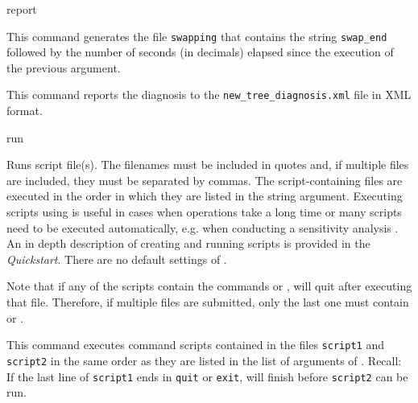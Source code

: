 \begin{command}{report}{}
\begin{poyexamples}
{This command generates the file \texttt{swapping} that contains
the string \texttt{swap\_end} followed by the number of seconds (in
decimals) elapsed since the execution of the previous 
argument.}

{This command reports the diagnosis to the \texttt{new\_tree\_diagnosis.xml}
file in XML format.}

\end{poyexamples}

\begin{poyalso}
\end{poyalso}

\end{command}


\begin{command}{run}{}

\syntax{\obligatory{(\poystring)}}

\begin{poydescription}
Runs \poy script file(s). The filenames must be included in
quotes and, if multiple files are included, they must be separated by commas.
The script-containing files are executed in the order in which they are listed
in the string argument.
Executing scripts using  is useful in cases when
operations take a long time or many scripts need to be executed automatically,
e.g. when conducting a sensitivity analysis \cite{wheeler1995}.
An in depth description of creating and running scripts is provided in 
the \emph{Quickstart}. There are no default settings of .
\end{poydescription}

\begin{statement}
Note that if any of the scripts contain the commands  or
, \poy will quit after executing that file. Therefore, if
multiple files are submitted, only the last one must contain 
or .
\end{statement}

\begin{poyexamples}
{This command executes \poy command scripts contained in the files \texttt{script1}
and \texttt{script2} in the same order as they are listed in the list of arguments of
. Recall: If the last line of \texttt{script1} ends in \texttt{quit} or 
\texttt{exit}, \poy will finish before \texttt{script2} can be run.}
\end{poyexamples}

\begin{poyalso}
\end{poyalso}

\end{command}

